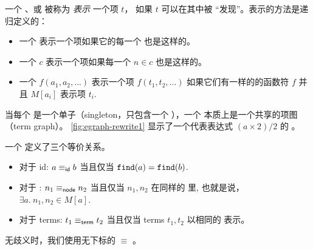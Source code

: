 \begin{definition}
  一个 \egraph、\eclass 或 \enode 被称为 \textit{表示} 一个项 $t$，
    如果 $t$ 可以在其中被 ``发现''。表示的方法是递归定义的：
  \begin{itemize}
    \item 一个 \egraph 表示一个项如果它的每一个 \eclasses 也是这样的。
    \item 一个 \eclass $c$ 表示一个项如果每一个 \enode $n \in c$ 也是这样的。
    \item 一个 \enode $f(a_{1}, a_{2}, ...)$ 表示一个项 $f(t_{1}, t_{2}, ...)$
          如果它们有一样的的函数符 $f$ 并且 \eclass $M[a_{i}]$ 表示项 $t_{i}$.
  \end{itemize}

  当每个 \eclass 是一个单子（singleton，只包含一个 \enode），一个 \egraph 本质上是一个共享的项图（term graph）。
  \autoref{fig:egraph-rewrite1} 显示了一个代表表达式 $(a\times 2) / 2$ 的 \egraph。
\end{definition}


\begin{definition}[等价，Equivalence]
  一个 \egraph 定义了三个等价关系。
  \begin{itemize} %
    \item 对于 \eclass id: $a \equiv_{\sf id} b$ 当且仅当 $\texttt{find}(a) = \texttt{find}(b)$.
    \item 对于 \enodes: $n_{1} \equiv_{\sf node} n_{2}$ 当且仅当 \enodes $n_{1}, n_{2}$ 在同样的 \eclass 里, 
          也就是说， $\exists a.\ n_{1}, n_{2} \in M[a]$.
    \item 对于 terms: $t_{1} \equiv_{\sf term} t_{2}$ 当且仅当 terms $t_{1}, t_{2}$ 以相同的 \eclass 表示。
  \end{itemize}

  无歧义时，我们使用无下标的 $\equiv$ 。
\end{definition}

